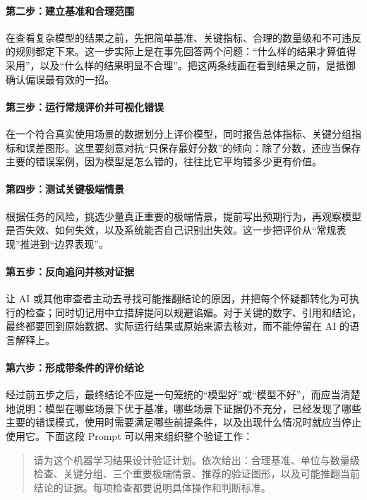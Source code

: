 \paragraph{第二步：建立基准和合理范围}
在查看复杂模型的结果之前，先把简单基准、关键指标、合理的数量级和不可违反的规则都定下来。这一步实际上是在事先回答两个问题：“什么样的结果才算值得采用”，以及“什么样的结果明显不合理”。把这两条线画在看到结果之前，是抵御确认偏误最有效的一招。

\paragraph{第三步：运行常规评价并可视化错误}
在一个符合真实使用场景的数据划分上评价模型，同时报告总体指标、关键分组指标和误差图形。这里要刻意对抗“只保存最好分数”的倾向：除了分数，还应当保存主要的错误案例，因为模型是怎么错的，往往比它平均错多少更有价值。

\paragraph{第四步：测试关键极端情景}
根据任务的风险，挑选少量真正重要的极端情景，提前写出预期行为，再观察模型是否失效、如何失效，以及系统能否自己识别出失效。这一步把评价从“常规表现”推进到“边界表现”。

\paragraph{第五步：反向追问并核对证据}
让 AI 或其他审查者主动去寻找可能推翻结论的原因，并把每个怀疑都转化为可执行的检查；同时切记用中立措辞提问以规避谄媚。对于关键的数字、引用和结论，最终都要回到原始数据、实际运行结果或原始来源去核对，而不能停留在 AI 的语言解释上。

\paragraph{第六步：形成带条件的评价结论}
经过前五步之后，最终结论不应是一句笼统的“模型好”或“模型不好”，而应当清楚地说明：模型在哪些场景下优于基准，哪些场景下证据仍不充分，已经发现了哪些主要的错误模式，使用时需要满足哪些前提条件，以及出现什么情况时就应当停止使用它。下面这段 Prompt 可以用来组织整个验证工作：

\begin{quote}
请为这个机器学习结果设计验证计划。依次给出：合理基准、单位与数量级检查、关键分组、三个重要极端情景、推荐的验证图形，以及可能推翻当前结论的证据。每项检查都要说明具体操作和判断标准。
\end{quote}

